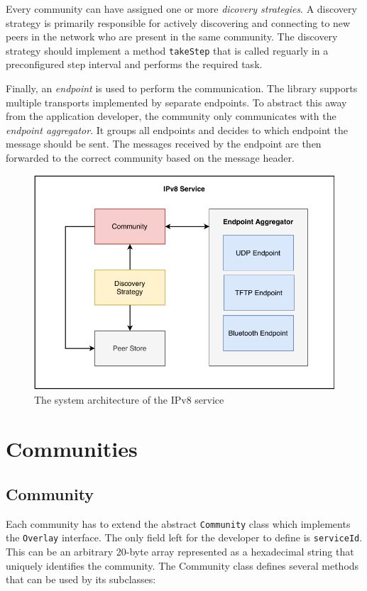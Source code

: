 Every community can have assigned one or more \textit{dicovery strategies}. A discovery strategy is primarily responsible for actively discovering and connecting to new peers in the network who are present in the same community. The discovery strategy should implement a method \texttt{takeStep} that is called reguarly in a preconfigured step interval and performs the required task.

Finally, an \textit{endpoint} is used to perform the communication. The library supports multiple transports implemented by separate endpoints. To abstract this away from the application developer, the community only communicates with the \textit{endpoint aggregator}. It groups all endpoints and decides to which endpoint the message should be sent. The messages received by the endpoint are then forwarded to the correct community based on the message header.

\begin{figure}
    \includegraphics[width=\textwidth]{diagrams/ipv8-architecture}
    \caption{The system architecture of the IPv8 service}
    \label{ipv8_architecture}
\end{figure}

\section{Communities}

\subsection{Community}

Each community has to extend the abstract \texttt{Community} class which implements the \texttt{Overlay} interface. The only field left for the developer to define is \texttt{serviceId}. This can be an arbitrary 20-byte array represented as a hexadecimal string that uniquely identifies the community. The Community class defines several methods that can be used by its subclasses:

